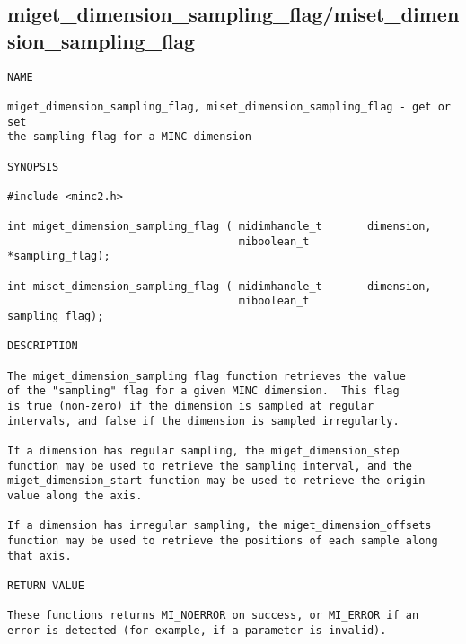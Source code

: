 \documentclass{article}
\begin{document}
\subsection{miget\_dimension\_sampling\_flag/miset\_dimension\_sampling\_flag}
\begin{verbatim}
NAME

miget_dimension_sampling_flag, miset_dimension_sampling_flag - get or set
the sampling flag for a MINC dimension

SYNOPSIS

#include <minc2.h>

int miget_dimension_sampling_flag ( midimhandle_t       dimension,
                                    miboolean_t         *sampling_flag);

int miset_dimension_sampling_flag ( midimhandle_t       dimension,
                                    miboolean_t         sampling_flag);

DESCRIPTION

The miget_dimension_sampling flag function retrieves the value
of the "sampling" flag for a given MINC dimension.  This flag
is true (non-zero) if the dimension is sampled at regular
intervals, and false if the dimension is sampled irregularly.

If a dimension has regular sampling, the miget_dimension_step
function may be used to retrieve the sampling interval, and the
miget_dimension_start function may be used to retrieve the origin
value along the axis.

If a dimension has irregular sampling, the miget_dimension_offsets
function may be used to retrieve the positions of each sample along
that axis.

RETURN VALUE

These functions returns MI_NOERROR on success, or MI_ERROR if an 
error is detected (for example, if a parameter is invalid).
\end{verbatim}
\end{document}
